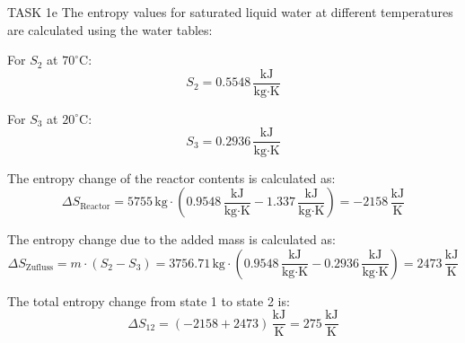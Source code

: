 TASK 1e  
The entropy values for saturated liquid water at different temperatures are calculated using the water tables:  

For \( S_2 \) at \( 70^\circ\text{C} \):  
\[
S_2 = 0.5548 \, \frac{\text{kJ}}{\text{kg·K}}
\]  

For \( S_3 \) at \( 20^\circ\text{C} \):  
\[
S_3 = 0.2936 \, \frac{\text{kJ}}{\text{kg·K}}
\]  

The entropy change of the reactor contents is calculated as:  
\[
\Delta S_{\text{Reactor}} = 5755 \, \text{kg} \cdot (0.9548 \, \frac{\text{kJ}}{\text{kg·K}} - 1.337 \, \frac{\text{kJ}}{\text{kg·K}}) = -2158 \, \frac{\text{kJ}}{\text{K}}
\]  

The entropy change due to the added mass is calculated as:  
\[
\Delta S_{\text{Zufluss}} = m \cdot (S_2 - S_3) = 3756.71 \, \text{kg} \cdot (0.9548 \, \frac{\text{kJ}}{\text{kg·K}} - 0.2936 \, \frac{\text{kJ}}{\text{kg·K}}) = 2473 \, \frac{\text{kJ}}{\text{K}}
\]  

The total entropy change from state 1 to state 2 is:  
\[
\Delta S_{12} = (-2158 + 2473) \, \frac{\text{kJ}}{\text{K}} = 275 \, \frac{\text{kJ}}{\text{K}}
\]